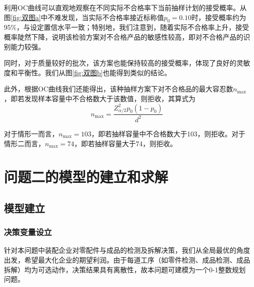 \documentclass[withoutpreface,bwprint]{cumcmthesis}
\begin{document}
利用OC曲线可以直观地观察在不同实际不合格率下当前抽样计划的接受概率。从图\ref{fig:双图a}中不难发现，当实际不合格率接近标称值$p_0=0.10$时，接受概率约为95\%，与设定置信水平一致；特别地，我们注意到，随着实际不合格率上升，接受概率陡然下降，说明该检验方案对不合格产品的敏感性较高，即对不合格产品的识别能力较强。

同时，对于质量较好的批次，该方案也能保持较高的接受概率，体现了良好的灵敏度和平衡性。我们从图\ref{fig:双图b}也能得到类似的结论。

此外，根据OC曲线我们还能得出，该种抽样方案下对不合格品的最大容忍数$n_{\text{max}}$，即若发现样本容量中不合格数大于该数值，则拒收，其算式为
\begin{equation}
   n_{\text{max}}=\frac{Z_{\alpha/2}^2p_0(1-p_0)}{d^2}
\end{equation}

对于情形一而言，$n_{\text{max}}=103$，即若抽样容量中不合格数大于103，则拒收。对于情形二而言，$n_{\text{max}}=74$，即若抽样容量大于74，则拒收。

\section{问题二的模型的建立和求解}
\subsection{模型建立}
\subsubsection{决策变量设立}
针对本问题中装配企业对零配件与成品的检测及拆解决策，我们从全局最优的角度出发，希望最大化企业的期望利润。由于每道工序（如零件检测、成品检测、成品拆解）均为可选动作，决策结果具有离散性，故本问题可建模为一个0-1整数规划问题。
\end{document}
